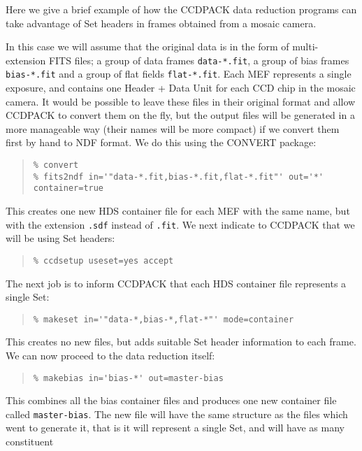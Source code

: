 \documentclass[twoside,11pt]{article}
\newcommand{\latexhtml}[2]{#1}
\newcommand{\xref}[3]{#1}
\renewcommand{\_}{\texttt{\symbol{95}}}
\newcommand{\ttsize}{\latexhtml{\small}{}}
\newenvironment{myquote}{\begin{quote}\ttsize}{\end{quote}}
\newcommand{\text}[1]{{\ttsize \tt #1}}
\begin{document}
Here we give a brief example of how the CCDPACK data reduction 
programs can take advantage of Set headers in frames obtained 
from a mosaic camera.

In this case we will assume that the original data is in the form
of multi-extension FITS files; a group of data frames \text{data-*.fit},
a group of bias frames \text{bias-*.fit} and a group of flat fields
\text{flat-*.fit}.  Each MEF represents a single exposure, 
and contains one Header + Data Unit for each
CCD chip in the mosaic camera.
It would be possible to leave these files in their
original format and allow CCDPACK to convert them on the fly,
but the output files will be generated in a more manageable way
(their names will be more compact) if we convert them first by
hand to NDF format.  We do this using the \xref{CONVERT}{sun55}{}
package:
\begin{myquote}
\begin{verbatim}
% convert
% fits2ndf in='"data-*.fit,bias-*.fit,flat-*.fit"' out='*' container=true
\end{verbatim}
\end{myquote}
This creates one new HDS container file for each MEF with the same name,
but with the extension \text{.sdf} instead of \text{.fit}.
We next indicate to CCDPACK that we will be using Set headers:
\begin{myquote}
\begin{verbatim}
% ccdsetup useset=yes accept
\end{verbatim}
\end{myquote}
The next job is to inform CCDPACK that each HDS container file 
represents a single Set:
\begin{myquote}
\begin{verbatim}
% makeset in='"data-*,bias-*,flat-*"' mode=container
\end{verbatim}
\end{myquote}
This creates no new files, but adds suitable Set header information to
each frame.
We can now proceed to the data reduction itself:
\begin{myquote}
\begin{verbatim}
% makebias in='bias-*' out=master-bias
\end{verbatim}
\end{myquote}
This combines all the bias container files and produces one new
container file called \text{master-bias}.  The new file will have
the same structure as the files which went to generate it, that is
it will represent a single Set, and will have as many constituent
\end{document}
